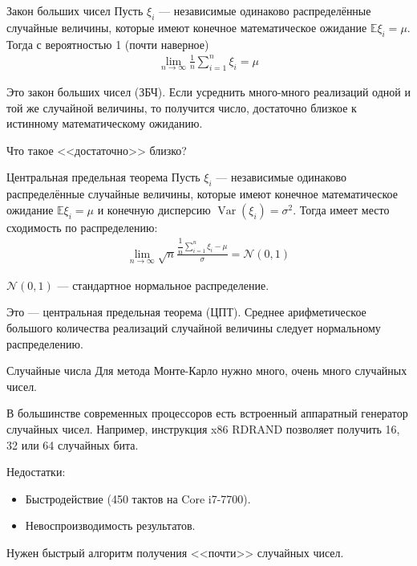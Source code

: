\documentclass{beamer}
\begin{document}
\begin{frame}{Закон больших чисел}
\justify
Пусть $\xi_i$ --- независимые одинаково распределённые случайные величины, которые имеют конечное математическое ожидание $\mathbb{E}\xi_i=\mu$. Тогда с вероятностью 1 (почти наверное)
\begin{align*}
\lim_{n \to \infty} \frac{1}{n} \sum\limits_{i=1}^{n}\xi_i = \mu
\end{align*}

\justify
Это закон больших чисел (ЗБЧ). Если усреднить много-много реализаций одной и той же случайной величины, то получится число, достаточно близкое к истинному математическому ожиданию.

\justify
Что такое <<достаточно>> близко?
\end{frame}



\begin{frame}{Центральная предельная теорема}
\justify
Пусть $\xi_i$ --- независимые одинаково распределённые случайные величины, которые имеют конечное математическое ожидание $\mathbb{E}\xi_i=\mu$ и конечную дисперсию $\operatorname{Var}(\xi_i) = \sigma^2$. Тогда имеет место сходимость по распределению:
\begin{align*}
\lim_{n \to \infty} \sqrt{n}\frac{\dfrac{1}{n}\sum\limits_{i=1}^{n}\xi_i - \mu}{\sigma} = \mathcal{N}(0, 1)
\end{align*}

\justify
$\mathcal{N}(0, 1)$ --- стандартное нормальное распределение.

\justify
Это --- центральная предельная теорема (ЦПТ). Среднее арифметическое большого количества реализаций случайной величины следует нормальному распределению.
\end{frame}



\begin{frame}{Случайные числа}
\justify
Для метода Монте-Карло нужно много, очень много случайных чисел.

\justify
В большинстве современных процессоров есть встроенный аппаратный генератор случайных чисел. Например, инструкция x86 RDRAND позволяет получить 16, 32 или 64 случайных бита.

\justify
Недостатки:
\begin{itemize}
\item Быстродействие (450 тактов на Core i7-7700).
\item Невоспроизводимость результатов.
\end{itemize}

\justify
Нужен быстрый алгоритм получения <<почти>> случайных чисел.
\end{frame}
\end{document}
